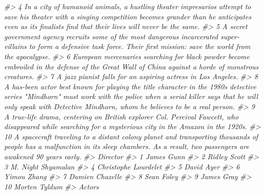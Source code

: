 \documentclass[
]{book}
\newenvironment{Shaded}{\begin{snugshade}}{\end{snugshade}}
\newcommand{\CommentTok}[1]{\textcolor[rgb]{0.56,0.35,0.01}{\textit{#1}}}
\begin{document}
\begin{Shaded}
\begin{Highlighting}[]
\CommentTok{\#\textgreater{} 4                   In a city of humanoid animals, a hustling theater impresario\textquotesingle{}s attempt to save his theater with a singing competition becomes grander than he anticipates even as its finalists\textquotesingle{} find that their lives will never be the same.}
\CommentTok{\#\textgreater{} 5                                                              A secret government agency recruits some of the most dangerous incarcerated super{-}villains to form a defensive task force. Their first mission: save the world from the apocalypse.}
\CommentTok{\#\textgreater{} 6                                                                                               European mercenaries searching for black powder become embroiled in the defense of the Great Wall of China against a horde of monstrous creatures.}
\CommentTok{\#\textgreater{} 7                                                                                                                                                                                     A jazz pianist falls for an aspiring actress in Los Angeles.}
\CommentTok{\#\textgreater{} 8  A has{-}been actor best known for playing the title character in the 1980s detective series "Mindhorn" must work with the police when a serial killer says that he will only speak with Detective Mindhorn, whom he believes to be a real person.}
\CommentTok{\#\textgreater{} 9                                                                                        A true{-}life drama, centering on British explorer Col. Percival Fawcett, who disappeared while searching for a mysterious city in the Amazon in the 1920s.}
\CommentTok{\#\textgreater{} 10                                                        A spacecraft traveling to a distant colony planet and transporting thousands of people has a malfunction in its sleep chambers. As a result, two passengers are awakened 90 years early.}
\CommentTok{\#\textgreater{}                Director}
\CommentTok{\#\textgreater{} 1            James Gunn}
\CommentTok{\#\textgreater{} 2          Ridley Scott}
\CommentTok{\#\textgreater{} 3    M. Night Shyamalan}
\CommentTok{\#\textgreater{} 4  Christophe Lourdelet}
\CommentTok{\#\textgreater{} 5            David Ayer}
\CommentTok{\#\textgreater{} 6           Yimou Zhang}
\CommentTok{\#\textgreater{} 7       Damien Chazelle}
\CommentTok{\#\textgreater{} 8            Sean Foley}
\CommentTok{\#\textgreater{} 9            James Gray}
\CommentTok{\#\textgreater{} 10        Morten Tyldum}
\CommentTok{\#\textgreater{}                                                                        Actors}

\end{Highlighting}
\end{Shaded}
\end{document}
